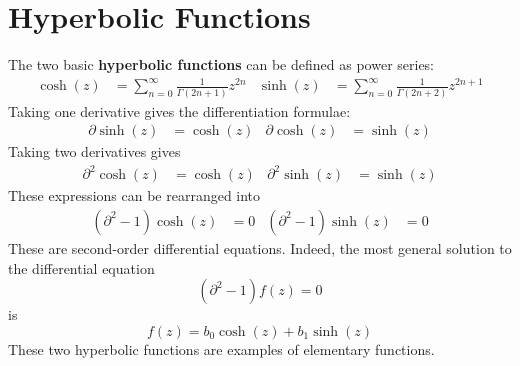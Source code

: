 \section{Hyperbolic Functions}
The two basic \textbf{hyperbolic functions} can be defined as power series:
\begin{align}
    \cosh(z) &= \sum_{n = 0}^{\infty} \frac{1}{\Gamma(2n + 1)} z^{2n} & \sinh(z) &= \sum_{n = 0}^{\infty} \frac{1}{\Gamma(2n + 2)} z^{2n + 1}
\end{align}
Taking one derivative gives the differentiation formulae:
\begin{align}
    \partial \sinh(z) &= \cosh(z) & \partial \cosh(z) &= \sinh(z)
\end{align}
Taking two derivatives gives
\begin{align}
    \partial^{2} \cosh(z) &= \cosh(z) & \partial^{2} \sinh(z) &= \sinh(z)
\end{align}
These expressions can be rearranged into
\begin{align}
    \left( \partial^{2} - 1 \right) \cosh(z) &= 0 & \left( \partial^{2} - 1 \right) \sinh(z) &= 0
\end{align}
These are second-order differential equations. Indeed, the most general solution to the differential equation
\begin{equation}
    \left( \partial^{2} - 1 \right) f(z) = 0
\end{equation}
is
\begin{equation}
    f(z) = b_{0} \cosh(z) + b_{1} \sinh(z)
\end{equation}
These two hyperbolic functions are examples of elementary functions.

